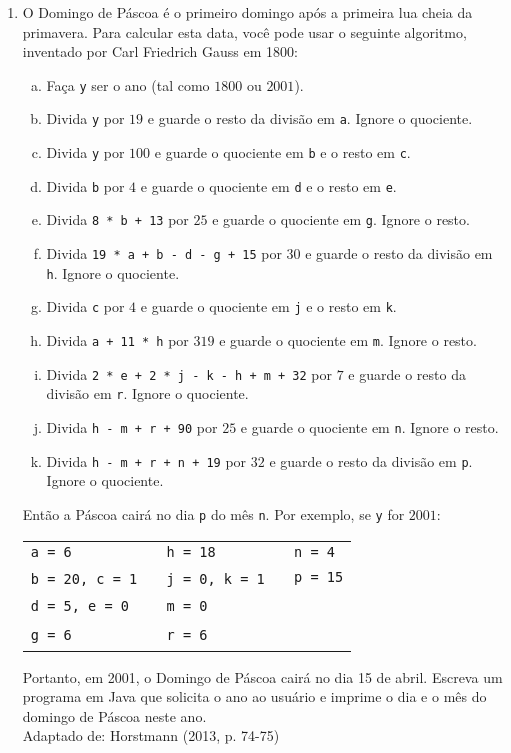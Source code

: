 \documentclass[onecolumn,a4paper,10pt]{report}
\newcommand{\+}{\, + \,}
\newcommand{\<}{\hspace*{-0.4cm}}
\begin{document}
\begin{enumerate}[1.]
\item O Domingo de Páscoa é o primeiro domingo após a primeira lua cheia da primavera. Para calcular esta data, você pode usar o seguinte algoritmo, inventado por Carl Friedrich Gauss em 1800:
\begin{enumerate}[a)]
	\item Faça \texttt{y} ser o ano (tal como $1800$ ou $2001$).
	\item Divida \texttt{y} por $19$ e guarde o resto da divisão em \texttt{a}. Ignore o quociente.
	\item Divida \texttt{y} por $100$ e guarde o quociente em \texttt{b} e o resto em \texttt{c}.
	\item Divida \texttt{b} por $4$ e guarde o quociente em \texttt{d} e o resto em \texttt{e}.
	\item Divida \texttt{8 * b + 13} por $25$ e guarde o quociente em \texttt{g}. Ignore o resto.
	\item Divida \texttt{19 * a + b - d - g + 15} por $30$ e guarde o resto da divisão em \texttt{h}. Ignore o quociente.
	\item Divida \texttt{c} por $4$ e guarde o quociente em \texttt{j} e o resto em \texttt{k}.
	\item Divida \texttt{a + 11 * h} por $319$ e guarde o quociente em \texttt{m}. Ignore o resto.
	\item Divida \texttt{2 * e + 2 * j - k - h + m + 32} por $7$ e guarde o resto da divisão em \texttt{r}. Ignore o quociente.
	\item Divida \texttt{h - m + r + 90} por $25$ e guarde o quociente em \texttt{n}. Ignore o resto.
	\item Divida \texttt{h - m + r + n + 19} por $32$ e guarde o resto da divisão em \texttt{p}. Ignore o quociente.
\end{enumerate}
Então a Páscoa cairá no dia \texttt{p} do mês \texttt{n}. Por exemplo, se \texttt{y} for $2001$:
\begin{center}
\begin{tabular}{lll}
\texttt{a = 6}         & \texttt{h = 18}       & \texttt{n = 4} \\
\texttt{b = 20, c = 1} ~ & \texttt{j = 0, k = 1} ~ & \texttt{p = 15} \\
\texttt{d = 5, e = 0}  & \texttt{m = 0}        & ~ \\
\texttt{g = 6}         & \texttt{r = 6}        & ~ \\
\end{tabular}
\end{center}
Portanto, em 2001, o Domingo de Páscoa cairá no dia 15 de abril. Escreva um programa em Java que solicita o ano ao usuário e imprime o dia e o mês do domingo de Páscoa neste ano.\\
{\tiny Adaptado de: Horstmann (2013, p. 74-75)}

\end{enumerate}
\end{document}
